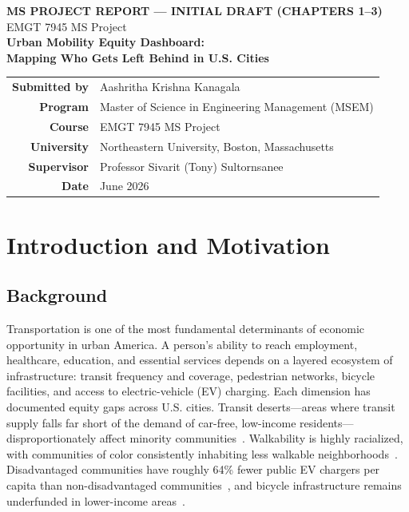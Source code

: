 \documentclass[11pt]{article}
\begin{document}
\thispagestyle{empty}
\begin{center}
{\large\bfseries MS PROJECT REPORT --- INITIAL DRAFT (CHAPTERS 1--3)}\\[2pt]
{\normalsize EMGT 7945 MS Project}\\[18pt]
{\LARGE\bfseries\color{neunavy} Urban Mobility Equity Dashboard:}\\[4pt]
{\Large\bfseries\color{neunavy} Mapping Who Gets Left Behind in U.S. Cities}\\[22pt]
\end{center}

\begin{center}
\renewcommand{\arraystretch}{1.3}
\begin{tabular}{r l}
\textbf{Submitted by} & Aashritha Krishna Kanagala \\
\textbf{Program} & Master of Science in Engineering Management (MSEM) \\
\textbf{Course} & EMGT 7945 MS Project \\
\textbf{University} & Northeastern University, Boston, Massachusetts \\
\textbf{Supervisor} & Professor Sivarit (Tony) Sultornsanee \\
\textbf{Date} & June 2026 \\
\end{tabular}
\end{center}

\vspace{18pt}
{\hypersetup{linkcolor=black}
\renewcommand{\contentsname}{\normalsize\bfseries Table of Contents}
\tableofcontents}
\newpage

\section{Introduction and Motivation}

\subsection{Background}
Transportation is one of the most fundamental determinants of economic
opportunity in urban America. A person's ability to reach employment, healthcare,
education, and essential services depends on a layered ecosystem of
infrastructure: transit frequency and coverage, pedestrian networks, bicycle
facilities, and access to electric-vehicle (EV) charging. Each dimension has
documented equity gaps across U.S. cities. Transit deserts---areas where transit
supply falls far short of the demand of car-free, low-income residents---
disproportionately affect minority communities~\cite{aman2020}. Walkability is
highly racialized, with communities of color consistently inhabiting less
walkable neighborhoods~\cite{urban2022}. Disadvantaged communities have roughly
64\% fewer public EV chargers per capita than non-disadvantaged
communities~\cite{lou2025}, and bicycle infrastructure remains underfunded in
lower-income areas~\cite{ahmed2024}.
\end{document}
